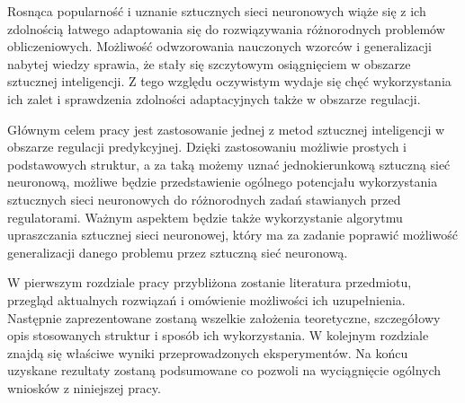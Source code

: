 \par Rosnąca popularność i uznanie sztucznych sieci neuronowych wiąże się z ich zdolnością łatwego adaptowania się do rozwiązywania różnorodnych problemów obliczeniowych. Możliwość odwzorowania nauczonych wzorców i generalizacji nabytej wiedzy sprawia, że stały się szczytowym osiągnięciem w obszarze sztucznej inteligencji. Z tego względu oczywistym wydaje się chęć wykorzystania ich zalet i sprawdzenia zdolności adaptacyjnych także w obszarze regulacji.
  
\par Głównym celem pracy jest zastosowanie jednej z metod sztucznej inteligencji w obszarze regulacji predykcyjnej. Dzięki zastosowaniu możliwie prostych i podstawowych struktur, a za taką możemy uznać jednokierunkową sztuczną sieć neuronową, możliwe będzie przedstawienie ogólnego potencjału wykorzystania sztucznych sieci neuronowych do różnorodnych zadań stawianych przed regulatorami. Ważnym aspektem będzie także wykorzystanie algorytmu upraszczania sztucznej sieci neuronowej, który ma za zadanie poprawić możliwość generalizacji danego problemu przez sztuczną sieć neuronową. 

\par W pierwszym rozdziale pracy przybliżona zostanie literatura przedmiotu, przegląd aktualnych rozwiązań i omówienie możliwości ich uzupełnienia. Następnie zaprezentowane zostaną wszelkie założenia teoretyczne, szczegółowy opis stosowanych struktur i sposób ich wykorzystania. W kolejnym rozdziale znajdą się właściwe wyniki przeprowadzonych eksperymentów. Na końcu uzyskane rezultaty zostaną podsumowane co pozwoli na wyciągnięcie ogólnych wniosków z niniejszej pracy. 



